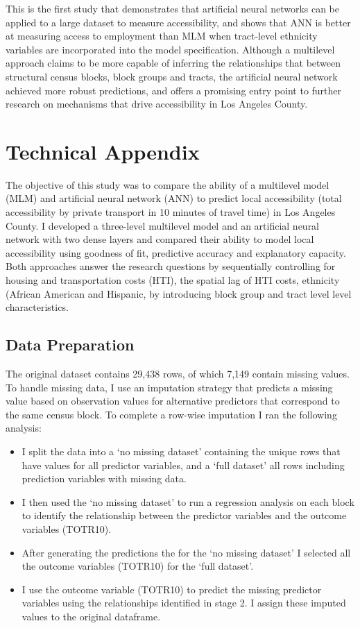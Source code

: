\documentclass[a4paper,UKenglish]{lipics-v2018}
\begin{document}
This is the first study that demonstrates that artificial neural networks can be applied to a large dataset to measure accessibility, and shows that ANN is better at measuring access to employment than MLM when tract-level ethnicity variables are incorporated into the model specification. Although a multilevel approach claims to be more capable of inferring the relationships that between structural census blocks, block groups and tracts, the artificial neural network achieved more robust predictions, and offers a promising entry point to further research on mechanisms that drive accessibility in Los Angeles County. 

\pagebreak
\section{Technical Appendix}
The objective of this study was to compare the ability of a multilevel model (MLM) and artificial neural network (ANN) to predict local accessibility (total accessibility by private transport in 10 minutes of travel time) in Los Angeles County. I developed a three-level multilevel model and an artificial neural network with two dense layers and compared their ability to model local accessibility using goodness of fit, predictive accuracy and explanatory capacity. Both approaches answer the research questions by sequentially controlling for housing and transportation costs (HTI), the spatial lag of HTI costs, ethnicity (African American and Hispanic, by introducing block group and tract level level characteristics.
\lstlistoflistings
\subsection{Data Preparation}
The original dataset contains 29,438 rows, of which 7,149 contain missing values. To handle missing data, I use an imputation strategy that predicts a missing value based on observation values for alternative predictors that correspond to the same census block. To complete a row-wise imputation I ran the following analysis:
\begin{itemize}
\item I split the data into a ‘no missing dataset’ containing the unique rows that have values for all predictor variables, and a ‘full dataset’ all rows including prediction variables with missing data.
\item I then used the ‘no missing dataset’ to run a regression analysis on each block to identify the relationship between the predictor variables and the outcome variables (TOTR10). 
\item After generating the predictions the for the ‘no missing dataset’ I selected all the outcome variables (TOTR10) for the ‘full dataset’.
\item I use the outcome variable (TOTR10) to predict the missing predictor variables using the relationships identified in stage 2.
I assign these imputed values to the original dataframe.
\end{itemize} 
\end{document}
